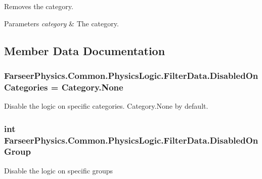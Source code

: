 Removes the category. 


\begin{DoxyParams}{Parameters}
{\em category} & The category.\\
\hline
\end{DoxyParams}


\subsection{Member Data Documentation}
\hypertarget{class_farseer_physics_1_1_common_1_1_physics_logic_1_1_filter_data_accff4c3d01561843d2e6daaf3db73c95}{
\subsubsection[{Disabled\+On\+Categories}]{ Farseer\+Physics.\+Common.\+Physics\+Logic.\+Filter\+Data.\+Disabled\+On\+Categories = Category.\+None}}\label{class_farseer_physics_1_1_common_1_1_physics_logic_1_1_filter_data_accff4c3d01561843d2e6daaf3db73c95}


Disable the logic on specific categories. Category.\+None by default. 

\hypertarget{class_farseer_physics_1_1_common_1_1_physics_logic_1_1_filter_data_ae3edc879b314a66d8ff67e5d2d0a8fec}{
\subsubsection[{Disabled\+On\+Group}]{\setlength{\rightskip}{0pt plus 5cm}int Farseer\+Physics.\+Common.\+Physics\+Logic.\+Filter\+Data.\+Disabled\+On\+Group}}\label{class_farseer_physics_1_1_common_1_1_physics_logic_1_1_filter_data_ae3edc879b314a66d8ff67e5d2d0a8fec}


Disable the logic on specific groups 

